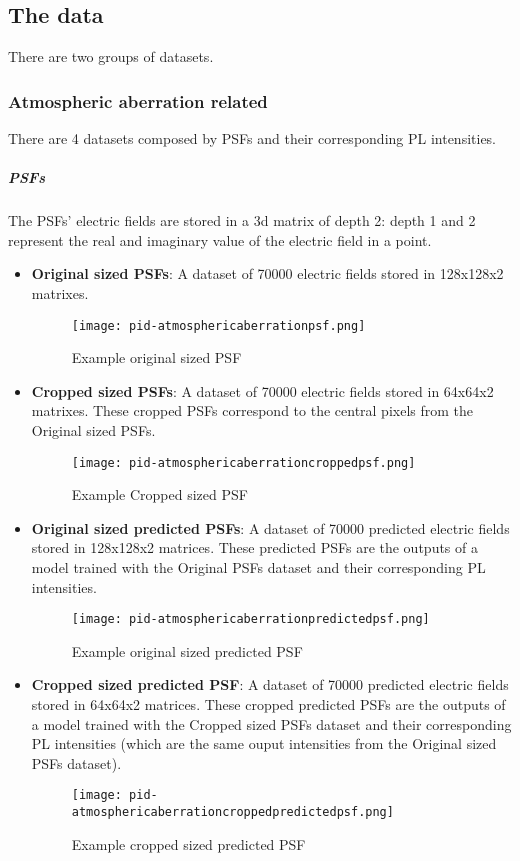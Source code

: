 \subsection{The data}
	There are two groups of datasets.
	
	\subsubsection{Atmospheric aberration related}
	
		There are 4 datasets composed by PSFs and their corresponding PL intensities.
		
		\subparagraph{PSFs}
			The PSFs' electric fields are stored in a 3d matrix of depth 2: depth 1 and 2 represent the real and imaginary value of the electric field in a point.
			\begin{itemize}
				\item \textbf{Original sized PSFs}: A dataset of 70000 electric fields stored in 128x128x2 matrixes.
				\begin{figure*}[ht!]
					\centering
					\texttt{[image: pid-atmosphericaberrationpsf.png]}
					\caption{Example original sized PSF}\hspace{\fill}
				\end{figure*}				
				\item \textbf{Cropped sized PSFs}:  A dataset of 70000 electric fields stored in 64x64x2 matrixes. These cropped  PSFs correspond to the central pixels from the Original sized PSFs.
				\begin{figure*}[ht!]
					\centering
					\texttt{[image: pid-atmosphericaberrationcroppedpsf.png]}
					\caption{Example Cropped sized PSF}\hspace{\fill}
				\end{figure*}			
				\item \textbf{Original sized predicted PSFs}:  A dataset of 70000 predicted electric fields stored in 128x128x2 matrices. These predicted PSFs are the outputs of a model trained with the Original PSFs dataset and their corresponding PL intensities.
				\begin{figure*}[ht!]
					\centering
					\texttt{[image: pid-atmosphericaberrationpredictedpsf.png]}
					\caption{Example original sized predicted PSF}\hspace{\fill}
				\end{figure*}			
				\item \textbf{Cropped sized predicted PSF}: A dataset of 70000 predicted electric fields stored in 64x64x2 matrices. These cropped predicted PSFs are the outputs of a model trained with the Cropped sized PSFs dataset and their corresponding PL intensities (which are the same ouput intensities from the Original sized PSFs dataset).
				\begin{figure*}[ht!]
					\centering
					\texttt{[image: pid-atmosphericaberrationcroppedpredictedpsf.png]}
					\caption{Example cropped sized predicted PSF}\hspace{\fill}
				\end{figure*}
				\FloatBarrier			
			\end{itemize}
			
